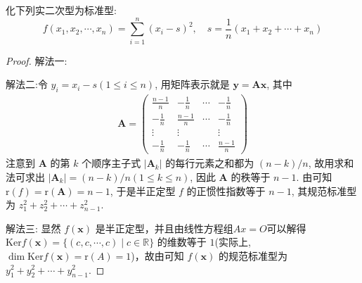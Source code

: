 \documentclass[../../main.tex]{subfiles}%
\begin{document}
\begin{example}\label{example:例8.34}
化下列实二次型为标准型:
\[f(x_1,x_2,\cdots,x_n)=\sum_{i = 1}^{n}(x_i - s)^2, \quad s = \frac{1}{n}(x_1 + x_2 + \cdots + x_n)\]
\end{example}
\begin{proof}

{\color{blue}解法一:}

{\color{blue}解法二:}令 \(y_i = x_i - s(1\leqslant  i\leqslant  n)\), 用矩阵表示就是 \(\boldsymbol{y} = \boldsymbol{A}\boldsymbol{x}\), 其中
\begin{align*}
\boldsymbol{A} = \begin{pmatrix}
\frac{n - 1}{n} & -\frac{1}{n} & \cdots & -\frac{1}{n} \\
-\frac{1}{n} & \frac{n - 1}{n} & \cdots & -\frac{1}{n} \\
\vdots & \vdots & & \vdots \\
-\frac{1}{n} & -\frac{1}{n} & \cdots & \frac{n - 1}{n}
\end{pmatrix}
\end{align*}
注意到 \(\boldsymbol{A}\) 的第 \(k\) 个顺序主子式 \(|\boldsymbol{A}_k|\) 的每行元素之和都为 \((n - k)/n\), 故用求和法可求出 \(|\boldsymbol{A}_k| = (n - k)/n(1\leqslant  k\leqslant  n)\), 因此 \(\boldsymbol{A}\) 的秩等于 \(n - 1\). 由可知 \(\mathrm{r}(f)=\mathrm{r}(\boldsymbol{A}) = n - 1\), 于是半正定型 \(f\) 的正惯性指数等于 \(n - 1\), 其规范标准型为 \(z_1^2 + z_2^2 + \cdots + z_{n - 1}^2\).

{\color{blue}解法三:}
显然 $f(\boldsymbol{x})$ 是半正定型，并且由线性方程组$Ax=O$可以解得 $\mathrm{Ker} f(\boldsymbol{x})=\{(c,c,\cdots,c)\mid c\in\mathbb{R}\}$ 的维数等于 $1$(实际上,$\dim \mathrm{Ker} f(\boldsymbol{x})=\mathrm{r}(A)=1$)，故由可知 $f(\boldsymbol{x})$ 的规范标准型为 $y_1^2 + y_2^2+\cdots + y_{n - 1}^2$.  

\end{proof}
\end{document}
